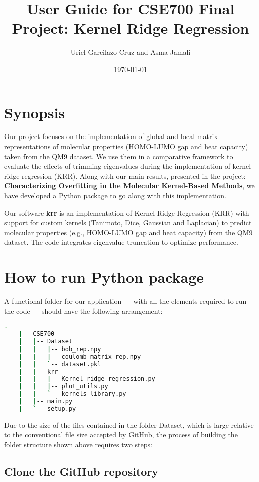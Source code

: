\documentclass{article}
\title{User Guide for CSE700 Final Project: Kernel Ridge Regression}
\author{Uriel Garcilazo Cruz and Asma Jamali}
\date{\today}
\begin{document}
\maketitle

\tableofcontents
\newpage 

\section{Synopsis}
Our project focuses on the implementation of global and local matrix representations of molecular properties (HOMO-LUMO gap and heat capacity) 
taken from the QM9 dataset. We use them in a comparative framework to evaluate the effects of trimming eigenvalues during the implementation of 
kernel ridge regression (KRR). Along with our main results, presented in the project:
\textbf{Characterizing Overfitting in the Molecular Kernel-Based Methods}, we have developed a Python package to go along with this implementation.

Our software \textbf{krr} is an implementation of Kernel Ridge Regression (KRR) with support for custom kernels (Tanimoto, Dice, Gaussian and Laplacian) to predict molecular properties (e.g., HOMO-LUMO gap and heat capacity)
 from the QM9 dataset. The code integrates eigenvalue truncation to optimize performance.

\section{How to run Python package}

A functional folder for our application — with all the elements required to run the code — should have the following arrangement:

\begin{lstlisting}[language=bash]
    .
    |-- CSE700
    |   |-- Dataset
    |   |   |-- bob_rep.npy
    |   |   |-- coulomb_matrix_rep.npy
    |   |   `-- dataset.pkl
    |   |-- krr
    |   |   |-- Kernel_ridge_regression.py
    |   |   |-- plot_utils.py
    |   |   `-- kernels_library.py
    |   |-- main.py
    |   `-- setup.py
\end{lstlisting}

Due to the size of the files contained in the folder Dataset, which is large relative to the conventional file size 
accepted by GitHub, the process of building the folder structure shown above requires two steps:

\subsection{Clone the GitHub repository}
\end{document}
